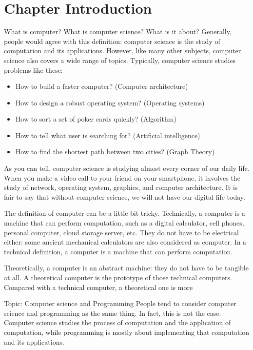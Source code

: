 \documentclass[../main.tex]{subfiles}
\begin{document}
    \section{Chapter Introduction}

    What is computer? What is computer science? What is it about? Generally, people would agree with
    this definition: computer science is the study of computation and its
    applications. However, like many other subjects, computer science also covers a
    wide range of topics. Typically, computer science studies problems like these:

    \begin{itemize}
        \item How to build a faster computer? (Computer architecture)
        \item How to design a robust operating system? (Operating systems)
        \item How to sort a set of poker cards quickly? (Algorithm)
        \item How to tell what user is searching for? (Artificial intelligence)
        \item How to find the shortest path between two cities? (Graph Theory)
    \end{itemize}

    As you can tell, computer science is studying almost every corner of our daily
    life. When you make a video call to your friend on your smartphone, it involves
    the study of network, operating system, graphics, and computer architecture. It
    is fair to say that without computer science, we will not have our digital life
    today.

    The definition of computer can be a little bit tricky. Technically, a computer
    is a machine that can perform computation, such as a digital calculator, cell
    phones, personal computer, cloud storage server, etc. They do not have to be
    electrical either: some ancient mechanical calculators are also considered as
    computer. In a technical definition, a computer is a machine that can perform
    computation.

    Theoretically, a computer is an abstract machine: they do not have to be
    tangible at all. A theoretical computer is the prototype of those technical
    computers. Compared with a technical computer, a theoretical one is more 

    Topic: Computer science and Programming
    People tend to consider computer science and programming as the same thing. In
    fact, this is not the case. Computer science studies the process of computation
    and the application of computation, while programming is mostly about
    implementing that computation and its applications.
\end{document}
